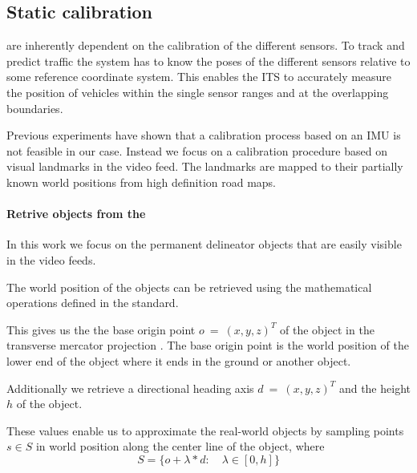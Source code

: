 
\subsection{Static calibration}

\ITS{} are inherently dependent on the calibration of the different sensors. 
To track and predict traffic the system has to know the poses of the different sensors relative to some reference coordinate system.
This enables the ITS to accurately measure the position of vehicles within the single sensor ranges and at the overlapping boundaries.

Previous experiments have shown that a calibration process based on an IMU is not feasible in our case. 
Instead we focus on a calibration procedure based on visual landmarks in the video feed.
The landmarks are mapped to their partially known world positions from high definition road maps. 


\paragraph{Retrive objects from the \HDmaps}
In this work we focus on the permanent delineator objects that are easily visible in the video feeds.

The world position of the objects can be retrieved using the mathematical operations defined in the \OD{} standard.

This gives us the the base origin point $o~=~(x, y, z)^T$ of the object in the transverse mercator projection \cite{proj}. 
The base origin point is the world position of the lower end of the object where it ends in the ground or another object.

Additionally we retrieve a directional heading axis $d~=~(x, y, z)^T$ and the height $h$ of the object.

These values enable us to approximate the real-world objects by sampling points $s \in S$ in world position along the center line of the object, where 
\begin{equation}
S = \{o + \lambda * d: \quad \lambda \in [0, h]\}
\end{equation}

